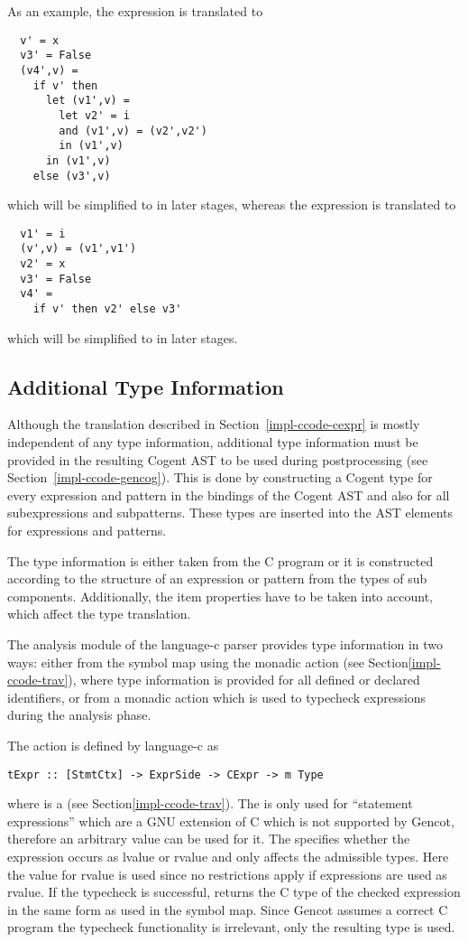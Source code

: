As an example, the expression  is translated to
\begin{verbatim}
  v' = x
  v3' = False
  (v4',v) =
    if v' then 
      let (v1',v) = 
        let v2' = i 
        and (v1',v) = (v2',v2') 
        in (v1',v) 
      in (v1',v)
    else (v3',v)
\end{verbatim}
which will be simplified to  in later stages,
whereas the expression  is translated to
\begin{verbatim}
  v1' = i
  (v',v) = (v1',v1')
  v2' = x
  v3' = False
  v4' =
    if v' then v2' else v3'
\end{verbatim}
which will be simplified to  in later stages.

\subsection{Additional Type Information}
\label{impl-ccode-type}

Although the translation described in Section~\ref{impl-ccode-cexpr} is mostly independent of any type
information, additional type information must be provided in the resulting Cogent AST to be used during
postprocessing (see Section~\ref{impl-ccode-gencog}). This is done by constructing a Cogent type for every
expression and pattern in the bindings of the Cogent AST and also for all subexpressions and subpatterns.
These types are inserted into the AST elements for expressions and patterns.

The type information is either taken from the C program or it is constructed according to the structure of an
expression or pattern from the types of sub components. Additionally, the item properties have to be taken
into account, which affect the type translation.

The analysis module of the language-c parser provides type information in two ways: either from the symbol map
using the monadic action  (see Section\ref{impl-ccode-trav}), where type information is
provided for all defined or declared identifiers, or from a monadic action  which is used to
typecheck expressions during the analysis phase.

The action  is defined by language-c as
\begin{verbatim}
tExpr :: [StmtCtx] -> ExprSide -> CExpr -> m Type
\end{verbatim}
where  is a  (see Section\ref{impl-ccode-trav}). The  is only used for
``statement expressions'' which are a GNU extension of C which is not supported by Gencot, therefore an arbitrary
value can be used for it. The  specifies whether the expression occurs as lvalue or rvalue and
only affects the admissible types. Here the value for rvalue is used since no restrictions apply if expressions
are used as rvalue. If the typecheck is successful,  returns the C type of the checked expression
in the same form as used in the symbol map. Since Gencot assumes a correct C program the typecheck functionality
is irrelevant, only the resulting type is used.


